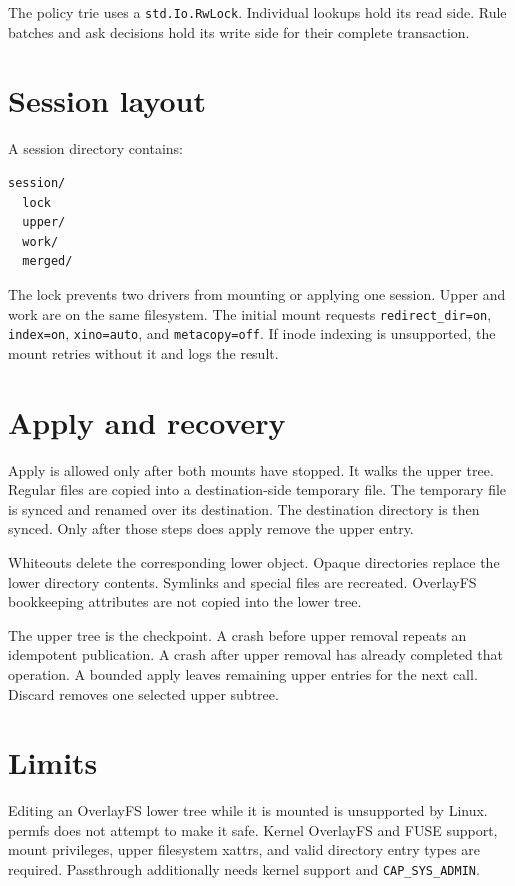 \documentclass[11pt,a4paper]{article}
\begin{document}
The policy trie uses a \texttt{std.Io.RwLock}. Individual lookups hold its read
side. Rule batches and ask decisions hold its write side for their complete
transaction.

\section{Session layout}

A session directory contains:

\begin{verbatim}
session/
  lock
  upper/
  work/
  merged/
\end{verbatim}

The lock prevents two drivers from mounting or applying one session. Upper
and work are on the same filesystem. The initial mount requests
\texttt{redirect\_dir=on}, \texttt{index=on}, \texttt{xino=auto}, and
\texttt{metacopy=off}. If inode indexing is unsupported, the mount retries
without it and logs the result.

\section{Apply and recovery}

Apply is allowed only after both mounts have stopped. It walks the upper tree.
Regular files are copied into a destination-side temporary file. The temporary
file is synced and renamed over its destination. The destination directory is
then synced. Only after those steps does apply remove the upper entry.

Whiteouts delete the corresponding lower object. Opaque directories replace
the lower directory contents. Symlinks and special files are recreated.
OverlayFS bookkeeping attributes are not copied into the lower tree.

The upper tree is the checkpoint. A crash before upper removal repeats an
idempotent publication. A crash after upper removal has already completed
that operation. A bounded apply leaves remaining upper entries for the next
call. Discard removes one selected upper subtree.

\section{Limits}

Editing an OverlayFS lower tree while it is mounted is unsupported by Linux.
permfs does not attempt to make it safe. Kernel OverlayFS and FUSE support,
mount privileges, upper filesystem xattrs, and valid directory entry types
are required. Passthrough additionally needs kernel support and
\texttt{CAP\_SYS\_ADMIN}.
\end{document}
